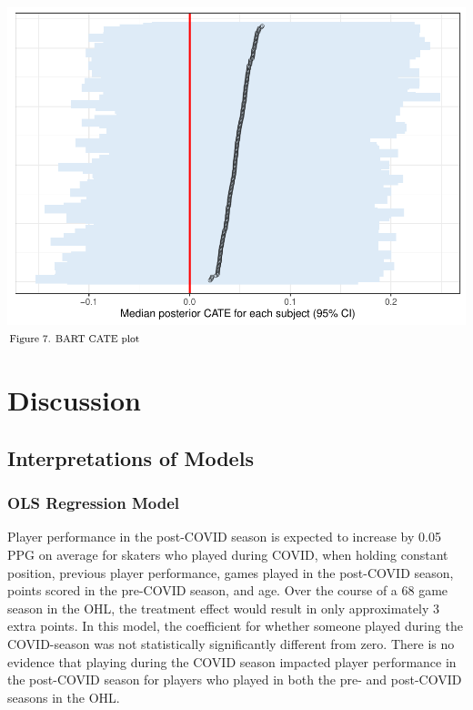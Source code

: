 \documentclass[12pt]{article}
\begin{document}
\includegraphics{journal-article_files/figure-latex/bart-cates-1.pdf}
\(\hspace*{\fill} \footnotesize \text{Figure 7. BART CATE plot}\)

\hypertarget{discussion}{%
\section{Discussion}\label{discussion}}

\hypertarget{interpretations-of-models}{%
\subsection{Interpretations of Models}\label{interpretations-of-models}}

\hypertarget{ols-regression-model}{%
\subsubsection{OLS Regression Model}\label{ols-regression-model}}

Player performance in the post-COVID season is expected to increase by
0.05 PPG on average for skaters who played during COVID, when holding
constant position, previous player performance, games played in the
post-COVID season, points scored in the pre-COVID season, and age. Over
the course of a 68 game season in the OHL, the treatment effect would
result in only approximately 3 extra points. In this model, the
coefficient for whether someone played during the COVID-season was not
statistically significantly different from zero. There is no evidence
that playing during the COVID season impacted player performance in the
post-COVID season for players who played in both the pre- and post-COVID
seasons in the OHL.
\end{document}
